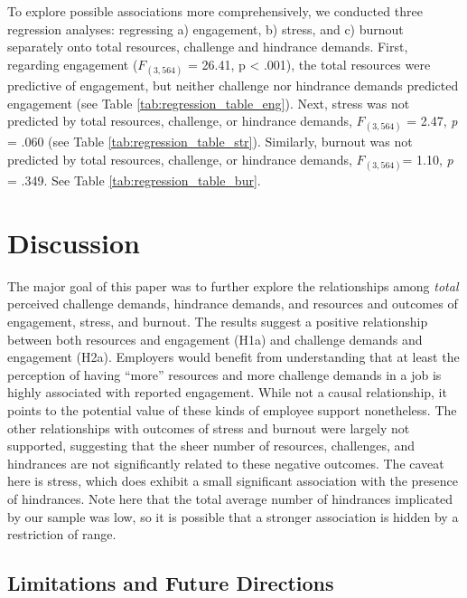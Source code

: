 \documentclass[
  man]{apa6}
\begin{document}
To explore possible associations more comprehensively, we conducted three regression analyses: regressing a) engagement, b) stress, and c) burnout separately onto total resources, challenge and hindrance demands. First, regarding engagement (\(F_{(3, 564)}\) = 26.41, p \textless{} .001), the total resources were predictive of engagement, but neither challenge nor hindrance demands predicted engagement (see Table \ref{tab:regression_table_eng}). Next, stress was not predicted by total resources, challenge, or hindrance demands, \(F_{(3, 564)}\) = 2.47, \emph{p} = .060 (see Table \ref{tab:regression_table_str}). Similarly, burnout was not predicted by total resources, challenge, or hindrance demands, \(F_{(3, 564)}\)= 1.10, \emph{p} = .349. See Table \ref{tab:regression_table_bur}.

\hypertarget{discussion}{%
\section{Discussion}\label{discussion}}

The major goal of this paper was to further explore the relationships among \emph{total} perceived challenge demands, hindrance demands, and resources and outcomes of engagement, stress, and burnout. The results suggest a positive relationship between both resources and engagement (H1a) and challenge demands and engagement (H2a). Employers would benefit from understanding that at least the perception of having ``more'' resources and more challenge demands in a job is highly associated with reported engagement. While not a causal relationship, it points to the potential value of these kinds of employee support nonetheless. The other relationships with outcomes of stress and burnout were largely not supported, suggesting that the sheer number of resources, challenges, and hindrances are not significantly related to these negative outcomes. The caveat here is stress, which does exhibit a small significant association with the presence of hindrances. Note here that the total average number of hindrances implicated by our sample was low, so it is possible that a stronger association is hidden by a restriction of range.

\hypertarget{limitations-and-future-directions}{%
\subsection{Limitations and Future Directions}\label{limitations-and-future-directions}}
\end{document}
